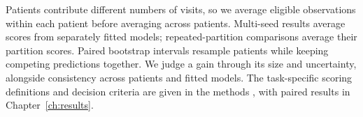 Patients contribute different numbers of visits, so we average eligible observations within each patient before averaging across patients. Multi-seed results average scores from separately fitted models; repeated-partition comparisons average their partition scores. Paired bootstrap intervals resample patients while keeping competing predictions together. We judge a gain through its size and uncertainty, alongside consistency across patients and fitted models. The task-specific scoring definitions and decision criteria are given in the methods \cite{record}, with paired results in Chapter~\ref{ch:results}.

\endgroup
